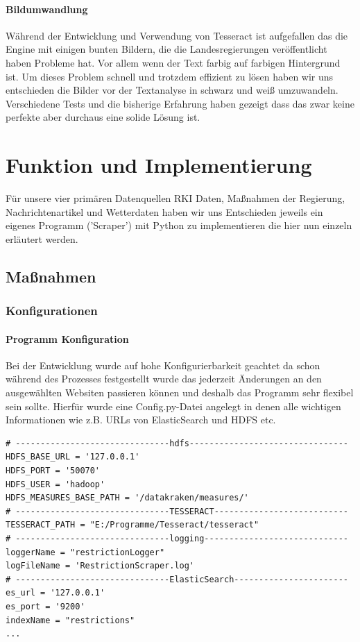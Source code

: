 \documentclass[12pt,oneside,a4paper,parskip]{scrbook}
\begin{document}
\subsubsection{Bildumwandlung}\label{sec:sub:sub:bild}
Während der Entwicklung und Verwendung von Tesseract ist aufgefallen das die Engine mit einigen bunten Bildern, die die Landesregierungen veröffentlicht haben Probleme hat. Vor allem wenn der Text farbig auf farbigen Hintergrund ist. Um dieses Problem schnell und trotzdem effizient zu lösen haben wir uns entschieden die Bilder vor der Textanalyse in schwarz und weiß umzuwandeln. Verschiedene Tests und die bisherige Erfahrung haben gezeigt dass das zwar keine perfekte aber durchaus eine solide Lösung ist.

\chapter{Funktion und Implementierung}

Für unsere vier primären Datenquellen RKI Daten, Maßnahmen der Regierung, Nachrichtenartikel und Wetterdaten haben wir uns Entschieden jeweils ein eigenes Programm ('Scraper') mit Python zu implementieren die hier nun einzeln erläutert werden.

\section{Maßnahmen}

\subsection{Konfigurationen}

\subsubsection{Programm Konfiguration}
Bei der Entwicklung wurde auf hohe Konfigurierbarkeit geachtet da schon während des Prozesses festgestellt wurde das jederzeit Änderungen an den ausgewählten Websiten passieren können und deshalb das Programm sehr flexibel sein sollte. Hierfür wurde eine Config.py-Datei angelegt in denen alle wichtigen Informationen wie z.B. URLs von ElasticSearch und HDFS etc.

\begin{lstlisting}[caption=Config für das Programm]
# -------------------------------hdfs--------------------------------
HDFS_BASE_URL = '127.0.0.1'
HDFS_PORT = '50070'
HDFS_USER = 'hadoop'
HDFS_MEASURES_BASE_PATH = '/datakraken/measures/'
# -------------------------------TESSERACT---------------------------
TESSERACT_PATH = "E:/Programme/Tesseract/tesseract"
# -------------------------------logging-----------------------------
loggerName = "restrictionLogger"
logFileName = 'RestrictionScraper.log'
# -------------------------------ElasticSearch-----------------------
es_url = '127.0.0.1'
es_port = '9200'
indexName = "restrictions"
...
\end{lstlisting}
\end{document}
